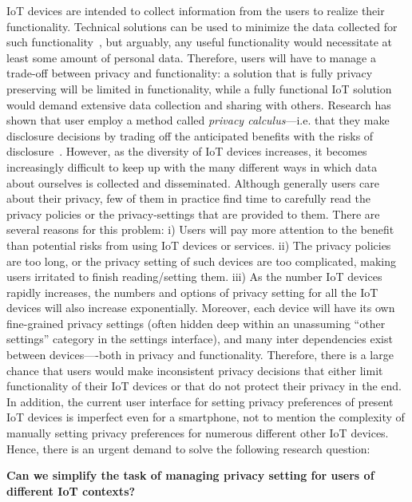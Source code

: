 IoT devices are intended to collect information from the users to realize their functionality. Technical solutions can be used to minimize the data collected for such functionality~\cite{kobsa2006privacy,pfitzmann2001anonymity,verykios2004state}, but arguably, any useful functionality would necessitate at least some amount of personal data. Therefore, users will have to manage a trade-off between privacy and functionality: a solution that is fully privacy preserving will be limited in functionality, while a fully functional IoT solution would demand extensive data collection and sharing with others. Research has shown that user employ a method called \textit{privacy calculus}---i.e. that they make disclosure decisions by trading off the anticipated benefits with the risks of disclosure~\cite{culnan1993did,laufer1977privacy,taylor2009privacy}. However, as the diversity of IoT devices increases, it becomes increasingly difficult to keep up with the many different ways in which data about ourselves is collected and disseminated. Although generally users care about their privacy, few of them in practice find time to carefully read the privacy policies or the privacy-settings that are provided to them. There are several reasons for this problem: i) Users will pay more attention to the benefit than potential risks from using IoT devices or services. ii) The privacy policies are too long, or the privacy setting of such devices are too complicated, making users irritated to finish reading/setting them. iii) As the number IoT devices rapidly increases, the numbers and options of privacy setting for all the IoT devices will also increase exponentially. Moreover, each device will have its own fine-grained privacy settings (often hidden deep within an unassuming “other settings” category in the settings interface), and many inter dependencies exist between devices—-both in privacy and functionality. Therefore, there is a large chance that users would make inconsistent privacy decisions that either limit functionality of their IoT devices or that do not protect their privacy in the end. In addition, the current user interface for setting privacy preferences of present IoT devices is imperfect even for a smartphone, not to mention the complexity of manually setting privacy preferences for numerous different other IoT devices. Hence, there is an urgent demand to solve the following research question:

\textbf{Can we simplify the task of managing privacy setting for users of different IoT contexts?}

